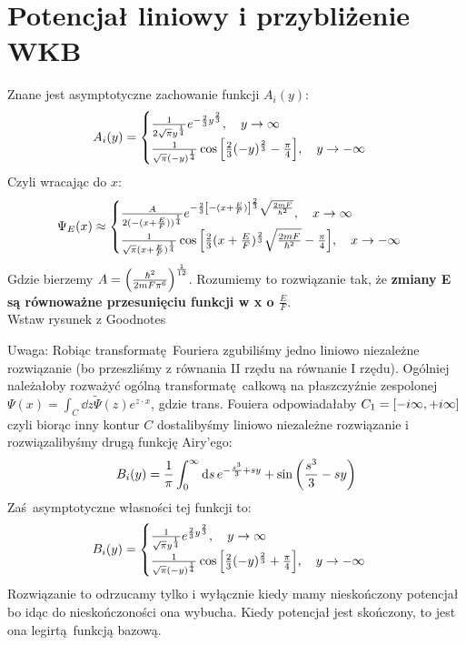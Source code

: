 \documentclass[12pt,a4paper]{report}
\newcommand{\com}[1]{{\color{red} #1}}
\newcommand{\tpsi}{\tilde{\Psi}}
\renewcommand{\emph}{\textbf}
\newenvironment{lecture}[1]{\par\medskip
   \noindent\chapter{#1} \rmfamily}{\medskip}
\begin{document}
\begin{lecture}{Potencjał liniowy i przybliżenie WKB}
Znane jest asymptotyczne zachowanie funkcji $A_i(y)$:
\[
    A_i(y) = \begin{cases}
        \frac{1}{2 \sqrt{\pi} y^{\frac14}} e^{-\frac23 y^{\frac23}}\qc y\to\infty\\
        \frac{1}{\sqrt{\pi} (-y)^{\frac14}} \cos\qty[\frac23 (-y)^{\frac23} - \frac{\pi}{4}]\qc y\to-\infty
    \end{cases}
\]
Czyli wracając do $x$:
\[
    \Psi_E(x) \approx \begin{cases}
        \frac{A}{2(-(x+\frac{E}{F}))^\frac14} e^{-\frac23 \qty[-(x+\frac{E}{F})]^{\frac23} \sqrt{\frac{2 m F}{\hbar^2}}}\qc x\to\infty\\
        \frac{1}{\sqrt{\pi} (x+\frac{E}{F})^{\frac14}} \cos\qty[\frac23(x+\frac{E}{F})^{\frac23} \sqrt{\frac{2 m F}{\hbar^2}} - \frac{\pi}{4}]\qc x\to-\infty
    \end{cases}
\]
Gdzie bierzemy $A = \qty(\frac{\hbar^2}{2mF\pi^6})^{\frac{1}{12}}$. Rozumiemy to rozwiązanie tak, że \emph{zmiany E są równoważne przesunięciu funkcji w x o $\frac{E}{F}$}.\\
\com{Wstaw rysunek z Goodnotes}


{\color{SkyBlue} Uwaga:} Robiąc transformatę Fouriera zgubiliśmy jedno liniowo niezależne rozwiązanie (bo przeszliśmy z równania II rzędu na równanie I rzędu). Ogólniej należałoby rozważyć ogólną transformatę całkową na płaszczyźnie zespolonej $\Psi(x) = \int_C \dd{z} \tpsi(z) e^{z\cdot x}$, gdzie trans. Fouiera odpowiadałaby $C_1 = \qty[-i\infty, +i\infty]$ czyli biorąc inny kontur $C$ dostalibyśmy liniowo niezależne rozwiązanie i rozwiązalibyśmy drugą funkcję Airy'ego:
\[
    B_i(y) = \frac{1}{\pi} \int_0^\infty \dd{s} e^{-\frac{s^3}{3} + sy} + \sin\qty(\frac{s^3}{3} - sy)
\]
Zaś asymptotyczne własności tej funkcji to:
\[
    B_i(y) = \begin{cases}
        \frac{1}{\sqrt{\pi} y^{\frac14}} e^{\frac23 y^{\frac23}}\qc y\to\infty\\
        \frac{1}{\sqrt{\pi} (-y)^{\frac14}} \cos\qty[\frac23 (-y)^{\frac23} + \frac{\pi}{4}]\qc y\to-\infty
    \end{cases}
\]
Rozwiązanie to odrzucamy tylko i wyłącznie kiedy mamy nieskończony potencjał bo idąc do nieskończoności ona wybucha. Kiedy potencjał jest skończony, to jest ona legirtą funkcją bazową.
\end{lecture}

\end{document}
